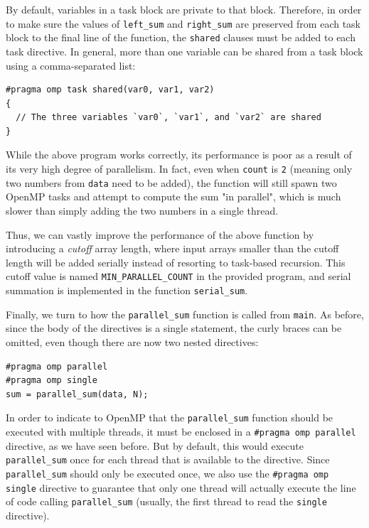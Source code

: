 \documentclass{article}
\theoremstyle{definition}
\begin{document}
By default, variables in a task block are private to that block. Therefore, in order to make sure the values of \texttt{left\_sum} and \texttt{right\_sum} are preserved from each task block to the final line of the function, the \texttt{shared} clauses must be added to each task directive. In general, more than one variable can be shared from a task block using a comma-separated list:

\begin{verbatim}
#pragma omp task shared(var0, var1, var2)
{
  // The three variables `var0`, `var1`, and `var2` are shared
}
\end{verbatim}

While the above program works correctly, its performance is poor as a result of its very high degree of parallelism. In fact, even when \texttt{count} is \texttt{2} (meaning only two numbers from \texttt{data} need to be added), the function will still spawn two OpenMP tasks and attempt to compute the sum "in parallel", which is much slower than simply adding the two numbers in a single thread.

Thus, we can vastly improve the performance of the above function by introducing a \emph{cutoff} array length, where input arrays smaller than the cutoff length will be added serially instead of resorting to task-based recursion. This cutoff value is named \texttt{MIN\_PARALLEL\_COUNT} in the provided program, and serial summation is implemented in the function \texttt{serial\_sum}.

Finally, we turn to how the \texttt{parallel\_sum} function is called from \texttt{main}. As before, since the body of the directives is a single statement, the curly braces can be omitted, even though there are now two nested directives:
\begin{verbatim}
#pragma omp parallel
#pragma omp single
sum = parallel_sum(data, N);
\end{verbatim}

In order to indicate to OpenMP that the \texttt{parallel\_sum} function should be executed with multiple threads, it must be enclosed in a \texttt{\#pragma omp parallel} directive, as we have seen before. But by default, this would execute \texttt{parallel\_sum} once for each thread that is available to the directive. Since \texttt{parallel\_sum} should only be executed once, we also use the \texttt{\#pragma omp single} directive to guarantee that only one thread will actually execute the line of code calling \texttt{parallel\_sum} (usually, the first thread to read the \texttt{single} directive).
\end{document}
